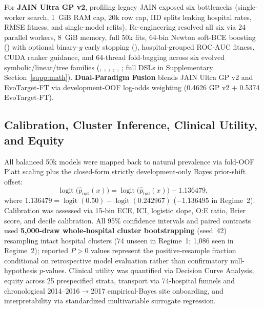 For \textbf{JAIN Ultra GP v2}, profiling legacy JAIN exposed six bottlenecks (single-worker search, 1~GiB RAM cap, 20k row cap, IID splits leaking hospital rates, RMSE fitness, and single-model refits). Re-engineering resolved all six via 24 parallel workers, 8~GiB memory, full 50k fits, 64-bin Newton soft-BCE boosting () with optional binary-$y$ early stopping (), hospital-grouped ROC-AUC fitness, CUDA ranker guidance, and 64-thread fold-bagging across six evolved symbolic/linear/tree families (, , , , , ; full DSLs in Supplementary Section~\ref{supp:math}). \textbf{Dual-Paradigm Fusion} blends JAIN Ultra GP v2 and EvoTarget-FT via development-OOF log-odds weighting (0.4626 GP v2 $+$ 0.5374 EvoTarget-FT).

\subsection{Calibration, Cluster Inference, Clinical Utility, and Equity}
All balanced 50k models were mapped back to natural prevalence via fold-OOF Platt scaling\cite{platt1999probabilistic} plus the closed-form strictly development-only Bayes prior-shift offset:\cite{king2001logistic,saerens2002adjusting}
\begin{equation}
  \operatorname{logit}\!\bigl(\hat{p}_{\mathrm{nat}}(x)\bigr) = \operatorname{logit}\!\bigl(\hat{p}_{\mathrm{bal}}(x)\bigr) - 1.136479,
  \label{eq:bayes_shift}
\end{equation}
where $1.136479 = \operatorname{logit}(0.50) - \operatorname{logit}(0.242967)$ ($-1.136495$ in Regime~2). Calibration was assessed via 15-bin ECE,\cite{guo2017calibration,vancalster2019calibration} ICI,\cite{austin2019ici} logistic slope, O:E ratio, Brier score, and decile calibration. All 95\% confidence intervals and paired contrasts used \textbf{5,000-draw whole-hospital cluster bootstrapping}\cite{davison1997bootstrap,obuchowski1997clustered} (seed~42) resampling intact hospital clusters (74 unseen in Regime~1; 1,086 seen in Regime~2); reported $P>0$ values represent the positive-resample fraction conditional on retrospective model evaluation rather than confirmatory null-hypothesis $p$-values. Clinical utility was quantified via Decision Curve Analysis,\cite{vickers2006decision} equity across 25 prespecified strata, transport via 74-hospital funnels and chronological 2014--2016$\to$2017 empirical-Bayes site onboarding, and interpretability via standardized multivariable surrogate regression.
